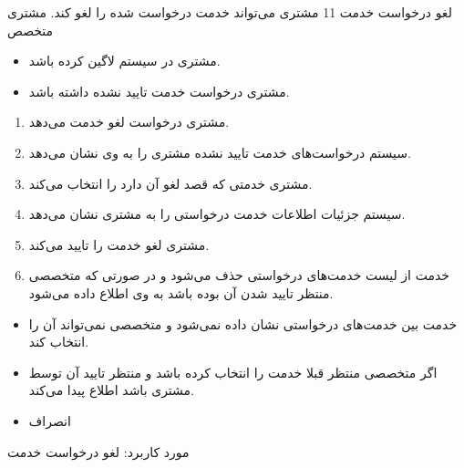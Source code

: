 {
\usecase
{
	لغو درخواست خدمت
}
{11}
{
	مشتری می‌تواند خدمت درخواست شده را لغو کند.
}
{
مشتری
}
{
	متخصص
}
{
	\begin{itemize}
		\vspace*{-0.6cm}
\item 
مشتری در سیستم لاگین کرده باشد.
\item 
مشتری درخواست خدمت تایید نشده داشته باشد.
	\end{itemize}
}
{
	\vspace*{-0.6cm}
	\begin{enumerate}
\item 
مشتری درخواست لغو خدمت می‌دهد.
\item
سیستم درخواست‌های خدمت تایید نشده مشتری را به وی نشان می‌دهد. 
\item
مشتری خدمتی که قصد لغو آن دارد را انتخاب می‌کند.
\item
سیستم جزئیات اطلاعات خدمت درخواستی را به مشتری نشان می‌دهد.
\item
مشتری لغو خدمت را تایید می‌کند.
\item
خدمت از لیست خدمت‌های درخواستی حذف می‌شود و در صورتی که متخصصی منتظر تایید شدن آن بوده باشد به وی اطلاع داده می‌شود.
	\end{enumerate}
}
{
		\begin{itemize}
		\vspace*{-0.6cm}
		\item 
خدمت بین خدمت‌های درخواستی نشان داده نمی‌شود و متخصصی نمی‌تواند آن را انتخاب کند.
		\item 
اگر متخصصی منتظر قبلا خدمت را انتخاب کرده باشد و منتظر تایید آن توسط مشتری باشد اطلاع پیدا می‌کند.
	\end{itemize}

}
{
			\begin{itemize}
		\vspace*{-0.6cm}
		\item
انصراف
\end{itemize}
}
{
	مورد کاربرد: لغو درخواست خدمت
}



}






